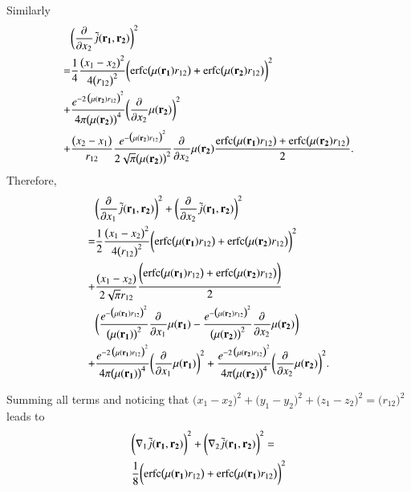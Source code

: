 \documentclass[aip,jcp,reprint,noshowkeys,superscriptaddress]{revtex4-1}
\newcommand{\deriv}[3]{\frac{\partial^{#3} #1}{\partial {#2}^{#3}}}
\newcommand{\bd}[1]{{\bf {#1}}}
\newcommand{\mur}[1]{\mu({\bf r_{#1}})}
\begin{document}
Similarly 
\begin{equation}
 \begin{aligned}
& \bigg(\deriv{}{x_2}{}\tilde{j}(\bd{r_1},\bd{r_2}) \bigg)^2  \\
 = & \frac{1}{4}\frac{\big( x_1 - x_2 \big)^2}{4 \big(r_{12}\big)^2} \bigg(\text{erfc}\big(\mur{1} r_{12}\big) + \text{erfc}\big(\mur{2} r_{12}\big) \bigg)^2  \\
 + & \frac{e^{-2 \,\big(\mur{2}r_{12} \big)^2}}{4\pi \big(\mur{2}\big)^4} \bigg( \deriv{}{x_2}{}\mur{2} \bigg)^2 \\
 + & \frac{\big(x_2 - x_1\big)}{r_{12}} \frac{e^{-\big(\mur{2} r_{12}\big)^2}}{2\sqrt{\pi} \big(\mur{2}\big)^2} \deriv{}{x_2}{}\mur{2} 
 \frac{\text{erfc}\big(\mur{1} r_{12}\big) + \text{erfc}\big(\mur{2} r_{12}\big)}{2}.
 \end{aligned}
\end{equation}
Therefore, 
\begin{equation}
 \begin{aligned}
& \bigg(\deriv{}{x_1}{}\tilde{j}(\bd{r_1},\bd{r_2}) \bigg)^2 + \bigg(\deriv{}{x_2}{}\tilde{j}(\bd{r_1},\bd{r_2}) \bigg)^2  \\
 = & \frac{1}{2}\frac{\big( x_1 - x_2 \big)^2}{4 \big(r_{12}\big)^2} \bigg(\text{erfc}\big(\mur{1} r_{12}\big) + \text{erfc}\big(\mur{2} r_{12}\big) \bigg)^2  \\
 + & \frac{\big(x_1 - x_2\big)}{2 \sqrt{\pi}r_{12}}  \frac{\bigg(\text{erfc}\big(\mur{1} r_{12}\big) + \text{erfc}\big(\mur{2} r_{12}\big) \bigg)}{2} \\
&\bigg(   \frac{e^{-\big(\mur{1} r_{12}\big)^2}}{\big(\mur{1}\big)^2} \deriv{}{x_1}{}\mur{1} 
- \frac{e^{-\big(\mur{2} r_{12}\big)^2}}{\big(\mur{2}\big)^2} \deriv{}{x_2}{}\mur{2} \bigg) \\
 + & \frac{e^{-2 \,\big(\mur{1}r_{12} \big)^2}}{4\pi \big(\mur{1}\big)^4} \bigg( \deriv{}{x_1}{}\mur{1} \bigg)^2 
 + \frac{e^{-2 \,\big(\mur{2}r_{12} \big)^2}}{4\pi \big(\mur{2}\big)^4} \bigg( \deriv{}{x_2}{}\mur{2} \bigg)^2.
 \end{aligned}
\end{equation}

Summing all terms and noticing that $\bigg(x_1 - x_2\bigg)^2 + \bigg(y_1 - y_2\bigg)^2 + \bigg(z_1 - z_2\bigg)^2 = \bigg(r_{12}\bigg)^2$ leads to 
\begin{equation}
 \begin{aligned}
& \bigg(\nabla_1\tilde{j}(\bd{r_1},\bd{r_2})\bigg)^2 + \bigg(\nabla_2\tilde{j}(\bd{r_1},\bd{r_2})\bigg)^2 = \\
& \frac{1}{8}\bigg(\text{erfc}\big(\mur{1} r_{12}\big) + \text{erfc}\big(\mur{1} r_{12}\big) \bigg)^2 
 \end{aligned}
\end{equation}

\end{document}

